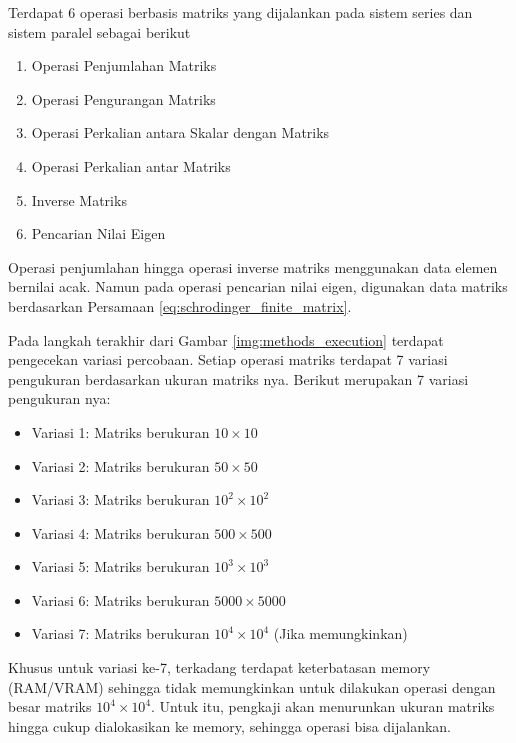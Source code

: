 Terdapat 6 operasi berbasis matriks yang dijalankan pada sistem series dan
sistem paralel sebagai berikut

\begin{enumerate}
	\item Operasi Penjumlahan Matriks
	\item Operasi Pengurangan Matriks
	\item Operasi Perkalian antara Skalar dengan Matriks
	\item Operasi Perkalian antar Matriks
	\item Inverse Matriks
	\item Pencarian Nilai Eigen
\end{enumerate}

\noindent
Operasi penjumlahan hingga operasi inverse matriks menggunakan data elemen bernilai acak. Namun pada operasi pencarian nilai eigen, digunakan data matriks berdasarkan Persamaan \ref{eq:schrodinger_finite_matrix}.

Pada langkah terakhir dari Gambar \ref{img:methods_execution} terdapat
pengecekan variasi percobaan. Setiap operasi matriks terdapat 7 variasi
pengukuran berdasarkan ukuran matriks nya. Berikut merupakan 7 variasi
pengukuran nya:

\begin{itemize}
	\item Variasi 1: Matriks berukuran $10 \times 10$
	\item Variasi 2: Matriks berukuran $50 \times 50$
	\item Variasi 3: Matriks berukuran $10^2 \times 10^2$
	\item Variasi 4: Matriks berukuran $500 \times 500$
	\item Variasi 5: Matriks berukuran $10^3 \times 10^3$
	\item Variasi 6: Matriks berukuran $5000 \times 5000$
	\item Variasi 7: Matriks berukuran $10^4 \times 10^4$ (Jika memungkinkan)
\end{itemize}

\noindent
Khusus untuk variasi ke-7, terkadang terdapat keterbatasan memory (RAM/VRAM) sehingga tidak memungkinkan untuk dilakukan operasi dengan besar matriks $10^4 \times 10^4$. Untuk itu, pengkaji akan menurunkan ukuran matriks hingga cukup dialokasikan ke memory, sehingga operasi bisa dijalankan.

